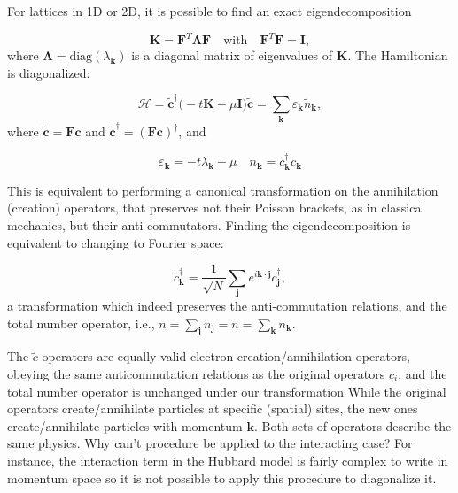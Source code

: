 For lattices in \acs{1D} or \acs{2D}, it is possible to find an exact eigendecomposition

\begin{equation}
\bm K = \bm F^T \bm \Lambda \bm F \quad \text{with}  \quad \bm F^T \bm F = \bm I ,
\end{equation}
where $\bm \Lambda = \text{diag}(\lambda_{\bm k})$ is a diagonal matrix of eigenvalues of $\bm K$.
The Hamiltonian is diagonalized:

\begin{equation}\label{eq:quadraticH}
\mathcal{H} =\tilde{\bm c}^\dagger \big( -t \bm K - \mu \bm I \big) \tilde{\bm c} = \sum_{\bm k} \varepsilon_{\bm k} \tilde{n}_{\bm k} ,
\end{equation}
where $\tilde{\bm c} = \bm F \bm c$ and $\tilde{\bm c}^\dagger = (\bm F \bm c)^\dagger$, and

\begin{equation}
\varepsilon_{\bm k} = -t \lambda_{\bm k} - \mu \quad \tilde{n}_{\bm k} = \tilde{c}_{\bm k}^\dagger \tilde{c}_{\bm k}
\end{equation}

This is equivalent to performing a canonical transformation on the annihilation (creation) operators, that preserves not their Poisson brackets, as in classical mechanics, but their anti-commutators.
Finding the eigendecomposition is equivalent to changing to Fourier space:

\begin{equation}
\tilde{c}_{\bm k}^\dagger = \frac{1}{\sqrt{N}} \sum_{\bm j} e^{i \bm k \cdot \bm j} c_{\bm j}^\dagger ,
\end{equation}
a transformation which indeed preserves the anti-commutation relations, and the total number operator, i.e., $n = \sum_{\bm j} n_{\bm j} = \tilde{n} = \sum_{\bm k} n_{\bm k}$.

The $\tilde{c}$-operators are equally valid electron creation/annihilation operators, obeying the same anticommutation relations as the original operators $c_i$, and the total number operator is unchanged under our transformation
While the original operators create/annihilate particles at specific (spatial) sites, the new ones create/annihilate particles with momentum ${\bm k}$.
Both sets of operators describe the same physics.
Why can't procedure be applied to the interacting case?
For instance, the interaction term in the Hubbard model is fairly complex to write in momentum space so it is not possible to apply this procedure to diagonalize it.


